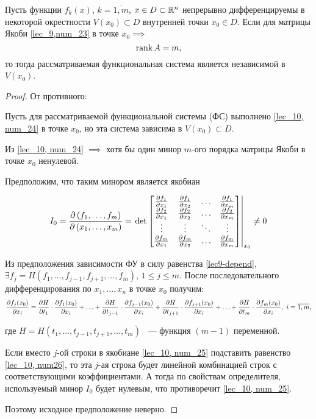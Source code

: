 \documentclass[../../main.tex]{subfiles}
\begin{document}
\begin{thm}
	Пусть функции $f_k\left(x\right)$, $k = \overline{1,m}$,
	$x \in D \subset \mathbb{R}^n$ непрерывно дифференцируемы в некоторой 
	окрестности $V(x_0) \subset D$ внутренней точки $x_0 \in D$. Если 
	для матрицы Якоби \eqref{lec_9,num_23} в точке $x_0 \implies$ 
	\begin{equation} \label{lec_10, num_24}
		\operatorname{rank} A = m,
	\end{equation}
 	то тогда рассматриваемая функциональная система 
 	является независимой в $V(x_0)$.
\end{thm}

\begin{proof}
	От противного:
	
	Пусть для рассматриваемой функциональной системы (ФС) 
	выполнено \eqref{lec_10, num_24} в точке $x_0$, но эта система 
	зависима в $V(x_0) \subset D$.
	
	Из \eqref{lec_10, num_24} $\implies$ хотя бы один минор $m$-ого 
	порядка матрицы Якоби в точке $x_0$ ненулевой.
	
	Предположим, что таким минором является якобиан
	
	\begin{equation} \label{lec_10, num_25}
		I_0 = \frac{\partial \left( f_1, \ldots, f_m \right)}{\partial  \left(x_1, 
		\ldots, x_m \right) } = \left.\det 
		\begin{bmatrix}
		\frac{\partial f_1}{\partial x_1} & \frac{\partial f_1}{\partial x_2} & \ldots & \frac{\partial f_1}{\partial x_m} \\
		\frac{\partial f_2}{\partial x_1} & \frac{\partial f_2}{\partial x_2} & \ldots & \frac{\partial f_2}{\partial x_m}\\
		\vdots & \vdots & \ddots & \vdots \\
		\frac{\partial f_m}{\partial x_1} & \frac{\partial f_m}{\partial x_2} & \ldots & \frac{\partial f_m}{\partial x_m}
		\end{bmatrix} \right|_{x_0}
		\neq 0
	\end{equation} 
	
	Из предположения зависимости ФУ в силу равенства 
	\eqref{lec9-depend},
	$\exists f_j = H( f_1, \ldots, f_{j-1}, f_{j+1}, \ldots, 
	f_m)$, $1 \le j \le m$.
	После последовательного дифференцирования по $x_1, \ldots, 
	x_n$ в точке $x_0$ получим:
	\begin{equation} \label{lec_10, num26}
		\frac{\partial f_j(x_0)}{\partial x_i} = \frac{\partial H}{\partial t_1}\cdot
		\frac{\partial f_1(x_0)}{\partial x_i} + \ldots + \frac{\partial H}{\partial  t_{j-1} } \cdot
		\frac{\partial  f_{j-1}(x_0) }{\partial x_i} + \frac{\partial H}{\partial  t_{j+1} } \cdot
		\frac{\partial  f_{j+1}(x_0) }{\partial x_i} + \ldots + \frac{\partial H}{\partial t_m} \cdot
	    \frac{\partial  f_m(x_0) }{\partial x_i},\ i = \overline{1, m},
	\end{equation}
	
	где $H = H\left( t_1, \ldots, t_{j-1}, t_{j+1}, \ldots, t_m 
	\right)$ ~--- функция $(m-1)$ переменной.
	
	Если вместо $j$-ой строки в якобиане \eqref{lec_10, num_25}
	подставить равенство \eqref{lec_10, num26}, то эта $j$-ая 
	строка будет линейной комбинацией строк с соответствующими 
	коэффициентами. А тогда по свойствам определителя, 
	используемый минор $I_0$ будет нулевым, что противоречит 
	\eqref{lec_10, num_25}.
	
	Поэтому исходное предположение неверно.
\end{proof}
\end{document}

